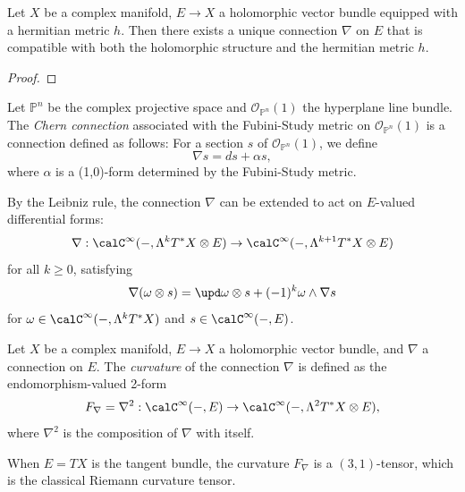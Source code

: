\begin{proposition}\label{prop:unique_compatible_connection_on_hermitian_vector_bundle}
	Let \(X\) be a complex manifold, \(E \to X\) a holomorphic vector bundle equipped with a hermitian metric \(h\).
	Then there exists a unique connection \(\nabla\) on \(E\) that is compatible with both the holomorphic structure and the hermitian metric \(h\).
\end{proposition}
\begin{proof}
\end{proof}

\begin{example}\label{eg:connection_on_P^n}
	Let \(\mathbb{P}^n\) be the complex projective space and \(\mathcal{O}_{\mathbb{P}^n}(1)\) the hyperplane line bundle.
	The \emph{Chern connection} associated with the Fubini-Study metric on \(\mathcal{O}_{\mathbb{P}^n}(1)\) is a connection defined as follows:
	For a section \(s\) of \(\mathcal{O}_{\mathbb{P}^n}(1)\), we define
	\[\nabla s = ds + \alpha s,\]
	where \(\alpha\) is a (1,0)-form determined by the Fubini-Study metric.
\end{example}

By the Leibniz rule, the connection \(\nabla\) can be extended to act on \(E\)-valued differential forms:
\[\nabla: \calC^\infty(-, \Lambda^k T^*X \otimes E) \to \calC^\infty(-, \Lambda^{k+1} T^*X \otimes E)\]
for all \(k \geq 0\), satisfying
\[\nabla(\omega \otimes s) = \upd\omega \otimes s + (-1)^k \omega \wedge \nabla s\]
for \(\omega \in \calC^\infty(-, \Lambda^k T^*X)\) and \(s \in \calC^\infty(-, E)\).

\begin{definition}\label{def:curvature_of_connection}
	Let \(X\) be a complex manifold, \(E \to X\) a holomorphic vector bundle, and \(\nabla\) a connection on \(E\).
	The \emph{curvature} of the connection \(\nabla\) is defined as the endomorphism-valued 2-form
	\[F_\nabla = \nabla^2: \calC^\infty(-, E) \to \calC^\infty(-, \Lambda^2 T^*X \otimes E),\]
	where \(\nabla^2\) is the composition of \(\nabla\) with itself.
\end{definition}

When \(E = TX\) is the tangent bundle, the curvature \(F_\nabla\) is a \((3,1)\)-tensor, which is the classical Riemann curvature tensor.

\begin{example}\label{eg:curvature_of_Fubini_Study_metric}
\end{example}

